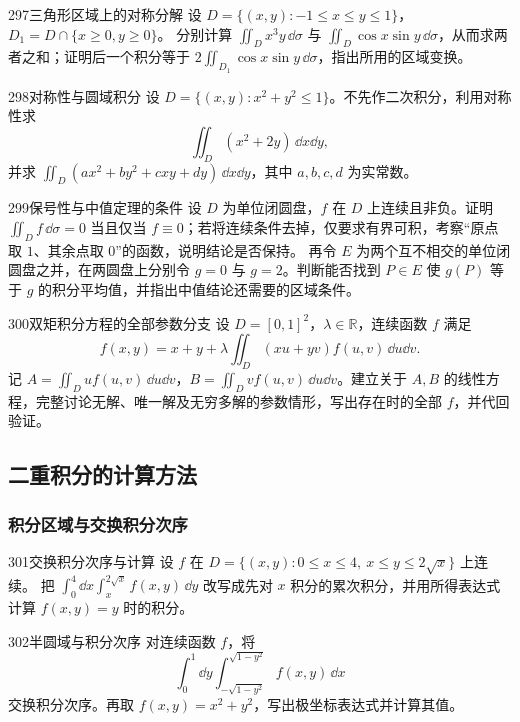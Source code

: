 \begin{exercise}{297}{三角形区域上的对称分解}
设 $D=\{(x,y):-1\leq x\leq y\leq1\}$，$D_1=D\cap\{x\geq0,y\geq0\}$。
分别计算 $\iint_Dx^3y\,\dd\sigma$ 与 $\iint_D\cos x\sin y\,\dd\sigma$，从而求两者之和；证明后一个积分等于 $2\iint_{D_1}\cos x\sin y\,\dd\sigma$，指出所用的区域变换。
\end{exercise}

\begin{exercise}{298}{对称性与圆域积分}
设 $D=\{(x,y):x^2+y^2\leq1\}$。不先作二次积分，利用对称性求
\[
 \iint_D(x^2+2y)\,\dd x\dd y,
\]
并求 $\iint_D(ax^2+by^2+cxy+dy)\,\dd x\dd y$，其中 $a,b,c,d$ 为实常数。
\end{exercise}

\begin{exercise}{299}{保号性与中值定理的条件}
设 $D$ 为单位闭圆盘，$f$ 在 $D$ 上连续且非负。证明 $\iint_Df\,\dd\sigma=0$ 当且仅当 $f\equiv0$；若将连续条件去掉，仅要求有界可积，考察“原点取 $1$、其余点取 $0$”的函数，说明结论是否保持。
再令 $E$ 为两个互不相交的单位闭圆盘之并，在两圆盘上分别令 $g=0$ 与 $g=2$。判断能否找到 $P\in E$ 使 $g(P)$ 等于 $g$ 的积分平均值，并指出中值结论还需要的区域条件。
\end{exercise}

\begin{exercise}{300}{双矩积分方程的全部参数分支}
设 $D=[0,1]^2$，$\lambda\in\mathbb R$，连续函数 $f$ 满足
\[
 f(x,y)=x+y+\lambda\iint_D(xu+yv)f(u,v)\,\dd u\dd v.
\]
记 $A=\iint_Duf(u,v)\,\dd u\dd v$，$B=\iint_Dvf(u,v)\,\dd u\dd v$。建立关于 $A,B$ 的线性方程，完整讨论无解、唯一解及无穷多解的参数情形，写出存在时的全部 $f$，并代回验证。
\end{exercise}

\subsection{二重积分的计算方法}
\subsubsection{积分区域与交换积分次序}

\begin{exercise}{301}{交换积分次序与计算}
设 $f$ 在 $D=\{(x,y):0\leq x\leq4,\ x\leq y\leq2\sqrt{x}\}$ 上连续。
把 $\int_0^4\dd x\int_x^{2\sqrt{x}}f(x,y)\,\dd y$ 改写成先对 $x$ 积分的累次积分，并用所得表达式计算 $f(x,y)=y$ 时的积分。
\end{exercise}

\begin{exercise}{302}{半圆域与积分次序}
对连续函数 $f$，将
\[
 \int_0^1\dd y\int_{-\sqrt{1-y^2}}^{\sqrt{1-y^2}}f(x,y)\,\dd x
\]
交换积分次序。再取 $f(x,y)=x^2+y^2$，写出极坐标表达式并计算其值。
\end{exercise}

